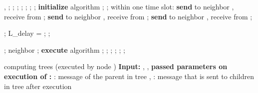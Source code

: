 \documentclass[11pt]{article}
\begin{document}
\begin{algorithm}[H]
\small
\begin{algorithmic}[1]
\STATE {}
\STATE , ;
\STATE ; 
\STATE ; \COMMENT{, }
\IF{}
        \STATE ;
        \STATE ;
        \STATE ;
\ENDIF
\STATE ;
\STATE \textbf{initialize} algorithm ;
\FOR{}
        \FOR{}
                \STATE ;
        \ENDFOR
        \STATE within one time slot:
        \newline \textbf{send}  to neighbor , receive  from ;
        \newline \textbf{send}  to neighbor , receive  from ;
        \newline 
        \newline \textbf{send}  to neighbor , receive  from ;
        
        \STATE ;
        \STATE L_{delay} = \emptyset;
        \IF{}
                \STATE ;
        \ENDIF
        
        \FOR{}
                        \IF{}
                                \STATE ;
                                \STATE  neighbor ;
                                \STATE \textbf{execute} algorithm ;
                                \STATE ;
                                \STATE ;
                                \IF{}
                                        \STATE ;
                                \ENDIF
                        \ELSE
                                \STATE ;
                        \ENDIF
                \ELSE
                        \STATE ; 
                \ENDIF
        \ENDFOR
\ENDFOR
\end{algorithmic}
\caption{computing  trees (executed by node ) \newline 
        \textbf{Input:} , ,  \newline 
        \textbf{passed parameters on execution of :} : message of the parent in tree , : message that is sent to children in tree  after execution}
\label{alg:TreeComputing}
\end{algorithm}
\end{document}

